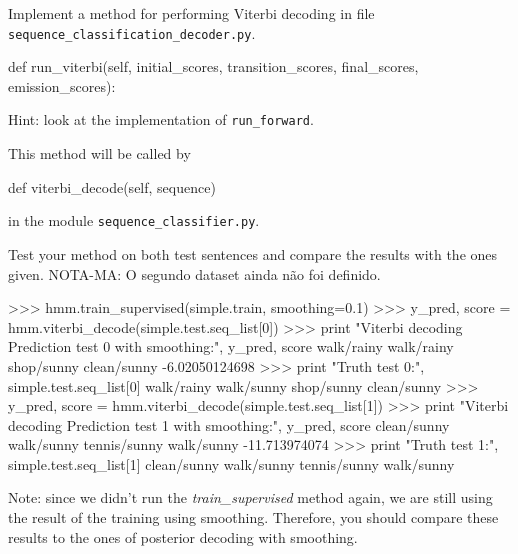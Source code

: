 \begin{exercise}
Implement a method 
for performing Viterbi decoding in 
file {\tt sequence\_classification\_decoder.py}.
\begin{python}
        def run_viterbi(self, initial_scores, transition_scores, final_scores, emission_scores):
\end{python}
Hint: look at the implementation of 
{\tt run\_forward}.

This method will be called 
by 
\begin{python}
def viterbi_decode(self, sequence)
\end{python}
in the module {\tt sequence\_classifier.py}.
%

Test your method on both test sentences and compare the results with
the ones given.
NOTA-MA: O segundo dataset ainda não foi definido.
\begin{python}
>>> hmm.train_supervised(simple.train, smoothing=0.1)
>>> y_pred, score = hmm.viterbi_decode(simple.test.seq_list[0])
>>> print "Viterbi decoding Prediction test 0 with smoothing:", y_pred, score
walk/rainy walk/rainy shop/sunny clean/sunny  -6.02050124698
>>> print "Truth test 0:", simple.test.seq_list[0]
walk/rainy walk/sunny shop/sunny clean/sunny 
>>> y_pred, score = hmm.viterbi_decode(simple.test.seq_list[1])
>>> print "Viterbi decoding Prediction test 1 with 
smoothing:", y_pred, score
clean/sunny walk/sunny tennis/sunny walk/sunny  -11.713974074
>>> print "Truth test 1:", simple.test.seq_list[1]
clean/sunny walk/sunny tennis/sunny walk/sunny 
\end{python}

Note: since we didn't run the \emph{train\_supervised} method again, we are still using the result of the training using smoothing. Therefore, you should compare these results to the ones of posterior decoding with smoothing.

\end{exercise}




